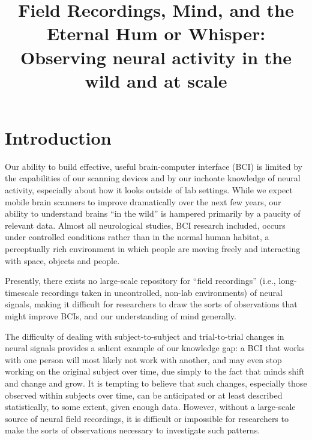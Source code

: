 \documentclass[a4paper,twoside]{article}
\begin{document}
\title{Field Recordings, Mind, and the Eternal Hum or Whisper: Observing neural activity in the wild and at scale}

\author{
}






\onecolumn \maketitle \normalsize \vfill




\section{Introduction}

Our ability to build effective, useful brain-computer interface (BCI) is limited by the capabilities of our scanning devices and by our inchoate knowledge of neural activity, especially about how it looks outside of lab settings. While we expect mobile brain scanners to improve dramatically over the next few years, our ability to understand brains ``in the wild'' is hampered primarily by a paucity of relevant data. Almost all neurological studies, BCI research included, occurs under controlled conditions rather than in the normal human habitat, a perceptually rich environment in which people are moving freely and interacting with space, objects and people.

Presently, there exists no large-scale repository for ``field recordings'' (i.e., long-timescale recordings taken in uncontrolled, non-lab environments) of neural signals, making it difficult for researchers to draw the sorts of observations that might improve BCIs, and our understanding of mind generally.

The difficulty of dealing with subject-to-subject and trial-to-trial changes in neural signals provides a salient example of our knowledge gap: a BCI that works with one person will most likely not work with another, and may even stop working on the original subject over time, due simply to the fact that minds shift and change and grow. It is tempting to believe that such changes, especially those observed within subjects over time, can be anticipated or at least described statistically, to some extent, given enough data. However, without a large-scale source of neural field recordings, it is difficult or impossible for researchers to make the sorts of observations necessary to investigate such patterns.
\end{document}
